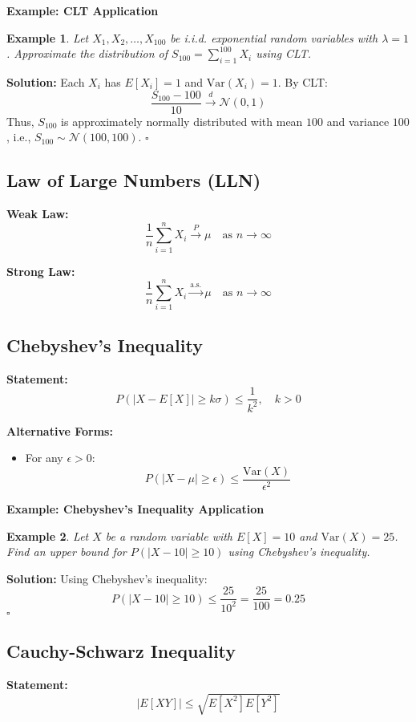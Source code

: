 \documentclass[12pt]{article}
\newtheorem{example}{Example}
\newenvironment{solution}{\noindent\textbf{Solution:}}{\hfill$\square$}
\begin{document}
\textbf{Example: CLT Application}
\begin{example}
Let \( X_1, X_2, \ldots, X_{100} \) be i.i.d. exponential random variables with \( \lambda = 1 \). Approximate the distribution of \( S_{100} = \sum_{i=1}^{100} X_i \) using CLT.
\end{example}
\begin{solution}
Each \( X_i \) has \( E[X_i] = 1 \) and \( \text{Var}(X_i) = 1 \). By CLT:
\[
\frac{S_{100} - 100}{10} \xrightarrow{d} \mathcal{N}(0,1)
\]
Thus, \( S_{100} \) is approximately normally distributed with mean \( 100 \) and variance \( 100 \), i.e., \( S_{100} \sim \mathcal{N}(100, 100) \).
\end{solution}

\subsection{Law of Large Numbers (LLN)}
\textbf{Weak Law:}
\[
\frac{1}{n} \sum_{i=1}^n X_i \xrightarrow{P} \mu \quad \text{as } n \to \infty
\]

\textbf{Strong Law:}
\[
\frac{1}{n} \sum_{i=1}^n X_i \xrightarrow{\text{a.s.}} \mu \quad \text{as } n \to \infty
\]

\subsection{Chebyshev’s Inequality}
\textbf{Statement:}
\[
P(|X - E[X]| \geq k\sigma) \leq \frac{1}{k^2}, \quad k > 0
\]

\textbf{Alternative Forms:}
\begin{itemize}
    \item For any \( \epsilon > 0 \):
    \[
    P(|X - \mu| \geq \epsilon) \leq \frac{\text{Var}(X)}{\epsilon^2}
    \]
\end{itemize}

\textbf{Example: Chebyshev’s Inequality Application}
\begin{example}
Let \( X \) be a random variable with \( E[X] = 10 \) and \( \text{Var}(X) = 25 \). Find an upper bound for \( P(|X - 10| \geq 10) \) using Chebyshev’s inequality.
\end{example}
\begin{solution}
Using Chebyshev’s inequality:
\[
P(|X - 10| \geq 10) \leq \frac{25}{10^2} = \frac{25}{100} = 0.25
\]
\end{solution}

\subsection{Cauchy-Schwarz Inequality}
\textbf{Statement:}
\[
|E[XY]| \leq \sqrt{E[X^2] E[Y^2]}
\]
\end{document}
